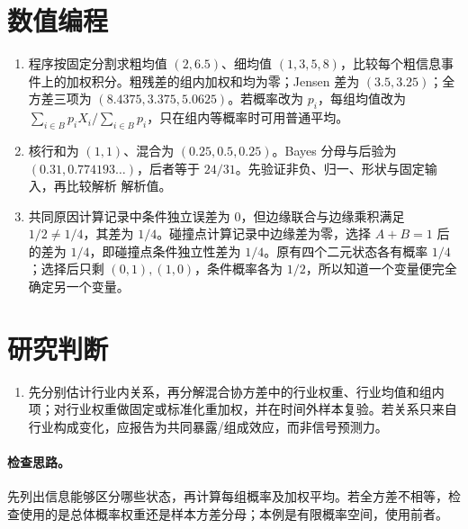 \section*{数值编程}
\begin{enumerate}[leftmargin=*]
  \item 程序按固定分割求粗均值 $(2,6.5)$、细均值 $(1,3,5,8)$，比较每个粗信息事件上的加权积分。粗残差的组内加权和均为零；Jensen 差为 $(3.5,3.25)$；全方差三项为 $(8.4375,3.375,5.0625)$。若概率改为 $p_i$，每组均值改为 $\sum_{i\in B}p_iX_i/\sum_{i\in B}p_i$，只在组内等概率时可用普通平均。
  \item 核行和为 $(1,1)$、混合为 $(0.25,0.5,0.25)$。Bayes 分母与后验为 $(0.31,0.774193\ldots)$，后者等于 $24/31$。先验证非负、归一、形状与固定输入，再比较解析 解析值。
  \item 共同原因计算记录中条件独立误差为 $0$，但边缘联合与边缘乘积满足 $1/2\ne1/4$，其差为 $1/4$。碰撞点计算记录中边缘差为零，选择 $A+B=1$ 后的差为 $1/4$，即碰撞点条件独立性差为 $1/4$。原有四个二元状态各有概率 $1/4$；选择后只剩 $(0,1),(1,0)$，条件概率各为 $1/2$，所以知道一个变量便完全确定另一个变量。
\end{enumerate}

\section*{研究判断}
\begin{enumerate}[leftmargin=*]
  \item 先分别估计行业内关系，再分解混合协方差中的行业权重、行业均值和组内项；对行业权重做固定或标准化重加权，并在时间外样本复验。若关系只来自行业构成变化，应报告为共同暴露/组成效应，而非信号预测力。
\end{enumerate}

\paragraph{检查思路。}先列出信息能够区分哪些状态，再计算每组概率及加权平均。若全方差不相等，检查使用的是总体概率权重还是样本方差分母；本例是有限概率空间，使用前者。



\MFQMappedUpperChEightSolutions
